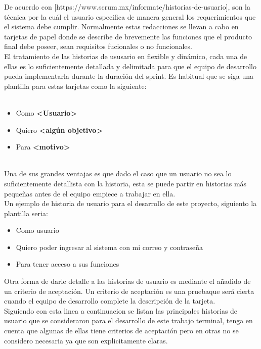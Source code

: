 De acuerdo con [https://www.scrum.mx/informate/historias-de-usuario], son la técnica por la cuál el usuario especifica de manera general
los requerimientos que el sistema debe cumplir.
Normalmente estas redacciones se llevan a cabo en tarjetas de papel donde se describe de brevemente las funciones que el producto final
debe poseer, sean requisitos fucionales o no funcionales.\\
El tratamiento de las historias de ususario en flexible y dinámico, cada una de ellas es lo suficientemente detallada y delimitada para que
el equipo de desarrollo pueda implementarla durante la duración del sprint. Es habitual que se siga una plantilla para estas tarjetas como la siguiente:\\
\\
\begin{itemize}
	\item Como \textbf{<Usuario>}
	\item Quiero \textbf{<algún objetivo>}
	\item Para \textbf{<motivo>}
\end{itemize}
\\
Una de sus grandes ventajas es que dado el caso que un usuario no sea lo suficientemente detallista con la historia, esta se puede partir en historias más pequeñas
antes de el equipo empiece a trabajar en ella.\\
Un ejemplo de historia de usuario para el desarrollo de este proyecto, siguiento la plantilla seria:\\

\begin{itemize}
	\item Como usuario
	\item Quiero poder ingresar al sistema con mi correo y contraseña
	\item Para tener acceso a sus funciones
\end{itemize}

Otra forma de darle detalle a las historias de usuario es mediante el añadido de un criterio de aceptación. Un criterio de aceptación es una pruebaque será cierta
cuando el equipo de desarrollo complete la descripción de la tarjeta.\\

Siguiendo con esta linea a continuacion se listan las principales historias de usuario que se consideraron para el desarrollo de este trabajo terminal,
tenga en cuenta que algunas de ellas tiene criterios de aceptación pero en otras no se considero necesaria ya que son explicitamente claras.\\

